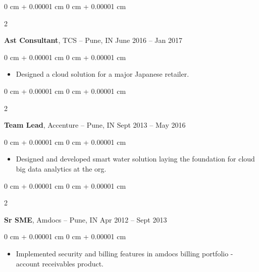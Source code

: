 \documentclass[10pt, letterpaper]{article}
\newenvironment{highlights}{
    \begin{itemize}[
        topsep=0.10 cm,
        parsep=0.10 cm,
        partopsep=0pt,
        itemsep=0pt,
        leftmargin=0 cm + 10pt
    ]
}{
    \end{itemize}
} %
\newenvironment{onecolentry}{
    \begin{adjustwidth}{
        0 cm + 0.00001 cm
    }{
        0 cm + 0.00001 cm
    }
}{
    \end{adjustwidth}
} %
\newenvironment{twocolentry}[2][]{
    \onecolentry
    \def\secondColumn{#2}
    \setcolumnwidth{\fill, 4.5 cm}
    \begin{paracol}{2}
}{
    \switchcolumn \raggedleft \secondColumn
    \end{paracol}
    \endonecolentry
} %
\begin{document}
        \vspace{0.2 cm}

        \begin{twocolentry}{
            June 2016 – Jan 2017
        }
            \textbf{Ast Consultant}, TCS -- Pune, IN\end{twocolentry}

        \vspace{0.10 cm}
        
        \begin{onecolentry}
            \begin{highlights}
                \item Designed a cloud solution for a major Japanese retailer.
            \end{highlights}
        \end{onecolentry}

        \vspace{0.2 cm}

        \begin{twocolentry}{
            Sept 2013 – May 2016
        }
            \textbf{Team Lead}, Accenture -- Pune, IN\end{twocolentry}

        \vspace{0.10 cm}
        
        \begin{onecolentry}
            \begin{highlights}
                \item Designed and developed smart water solution laying the foundation for cloud big data analytics at the org.
            \end{highlights}
        \end{onecolentry}


        \begin{twocolentry}{
            Apr 2012 – Sept 2013
        }
            \textbf{Sr SME}, Amdocs -- Pune, IN\end{twocolentry}

        \vspace{0.10 cm}
        
        \begin{onecolentry}
            \begin{highlights}
                \item Implemented security and billing features in amdocs billing portfolio - account receivables product.
            \end{highlights}
        \end{onecolentry}
\end{document}
